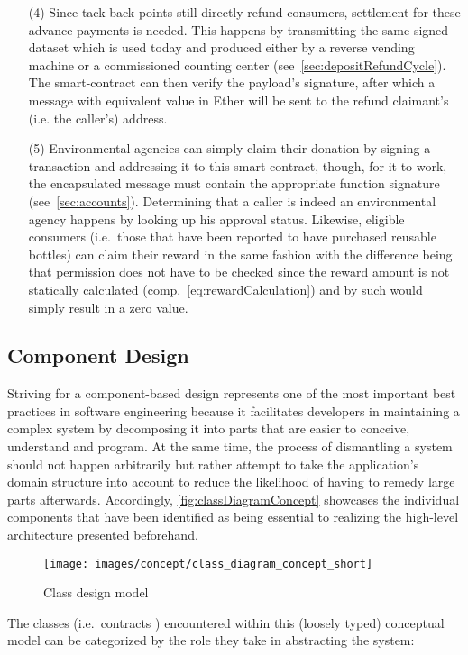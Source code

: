 \begin{itemize}
	\item [(4)] Since tack-back points still directly refund consumers, settlement for these advance payments is needed. This happens by transmitting the same signed dataset which is used today and produced either by a reverse vending machine or a commissioned counting center (see~\ref{sec:depositRefundCycle}). The smart-contract can then verify the payload's signature, after which a message with equivalent value in Ether will be sent to the refund claimant's (i.e. the caller's) address. 
	\item [(5)] Environmental agencies can simply claim their donation by signing a transaction and addressing it to this smart-contract, though, for it to work, the encapsulated message must contain the appropriate function signature (see~\ref{sec:accounts}). Determining that a caller is indeed an environmental agency happens by looking up his approval status. Likewise, eligible consumers (i.e.~those that have been reported to have purchased reusable bottles) can claim their reward in the same fashion with the difference being that permission does not have to be checked since the reward amount is not statically calculated (comp.~\autoref{eq:rewardCalculation}) and by such would simply result in a zero value.
\end{itemize}

\subsection{Component Design}
Striving for a component-based design represents one of the most important best practices in software engineering because it facilitates developers in maintaining a complex system by decomposing it into parts that are easier to conceive, understand and program. At the same time, the process of dismantling a system should not happen arbitrarily but rather attempt to take the application's domain structure into account to reduce the likelihood of having to remedy large parts afterwards. Accordingly, \autoref{fig:classDiagramConcept} showcases the individual components that have been identified as being essential to realizing the high-level architecture presented beforehand.

\begin{figure}[hbt]
	  \texttt{[image: images/concept/class\_diagram\_concept\_short]}
	  \caption{Class design model}
	  \label{fig:classDiagramConcept}
\end{figure}

The classes (i.e.~contracts \cite[p.~75]{solidityDocs}) encountered within this (loosely typed) conceptual model can be categorized by the role they take in abstracting the system:

